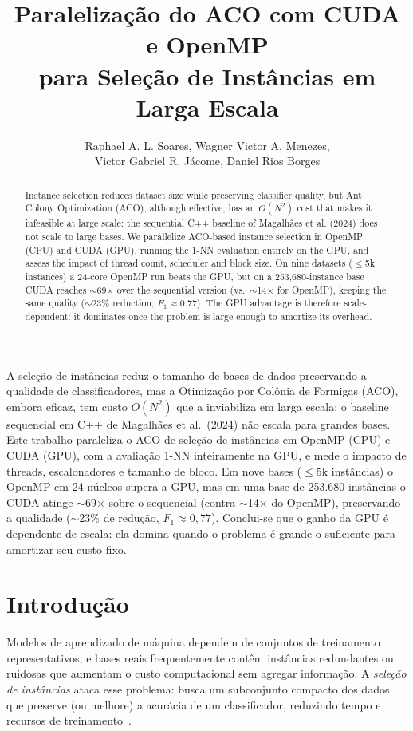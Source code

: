 \documentclass[12pt]{article}
\title{Paralelização do ACO com CUDA e OpenMP\\ para Seleção de Instâncias em Larga Escala}
\author{Raphael A. L. Soares\inst{1}, Wagner Victor A. Menezes\inst{1}, \\ Victor Gabriel R. Jácome\inst{1}, Daniel Rios Borges\inst{1} }
\begin{document}
\maketitle

\begin{abstract}
  Instance selection reduces dataset size while preserving classifier quality, but
  Ant Colony Optimization (ACO), although effective, has an $O(N^2)$ cost that makes it
  infeasible at large scale: the sequential C++ baseline of Magalhães et al. (2024) does
  not scale to large bases. We parallelize ACO-based instance selection in OpenMP (CPU)
  and CUDA (GPU), running the 1-NN evaluation entirely on the GPU, and assess the impact
  of thread count, scheduler and block size. On nine datasets ($\leq$5k instances) a
  24-core OpenMP run beats the GPU, but on a 253{,}680-instance base CUDA reaches
  $\sim$69$\times$ over the sequential version (vs.\ $\sim$14$\times$ for OpenMP), keeping
  the same quality ($\sim$23\% reduction, $F_1\approx0.77$). The GPU advantage is therefore
  scale-dependent: it dominates once the problem is large enough to amortize its overhead.
\end{abstract}

\begin{resumo}
  A seleção de instâncias reduz o tamanho de bases de dados preservando a qualidade de
  classificadores, mas a Otimização por Colônia de Formigas (ACO), embora eficaz, tem custo
  $O(N^2)$ que a inviabiliza em larga escala: o baseline sequencial em C++ de Magalhães et
  al.\ (2024) não escala para grandes bases. Este trabalho paraleliza o ACO de seleção de
  instâncias em OpenMP (CPU) e CUDA (GPU), com a avaliação 1-NN inteiramente na GPU, e mede o
  impacto de threads, escalonadores e tamanho de bloco. Em nove bases ($\leq$5k instâncias) o
  OpenMP em 24 núcleos supera a GPU, mas em uma base de 253.680 instâncias o CUDA atinge
  $\sim$69$\times$ sobre o sequencial (contra $\sim$14$\times$ do OpenMP), preservando a
  qualidade ($\sim$23\% de redução, $F_1\approx0{,}77$). Conclui-se que o ganho da GPU é
  dependente de escala: ela domina quando o problema é grande o suficiente para amortizar seu
  custo fixo.
\end{resumo}


\section{Introdução}

Modelos de aprendizado de máquina dependem de conjuntos de treinamento representativos, e
bases reais frequentemente contêm instâncias redundantes ou ruidosas que aumentam o custo
computacional sem agregar informação. A \textit{seleção de instâncias} ataca esse problema:
busca um subconjunto compacto dos dados que preserve (ou melhore) a acurácia de um
classificador, reduzindo tempo e recursos de treinamento~\cite{olvera2010}.
\end{document}
